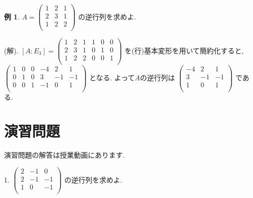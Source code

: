 \documentclass[dvipdfmx,a4paper,11pt]{article}
\theoremstyle{definition}
\newtheorem{exa}[thm]{例}
\begin{document}
 \begin{exa}
 $
  A=\begin{pmatrix}
 1& 2&1 \\
 2& 3 & 1 \\
 1& 2 &  2 \\
 \end{pmatrix} 
 $
 の逆行列を求めよ.
 
 (解).
 $[A:E_3] = 
 \begin{pmatrix}
 1& 2&1  &1& 0&0 \\
 2& 3 & 1 &0& 1&0 \\
 1& 2 &  2 &0& 0&1 \\
 \end{pmatrix} 
 $
 を(行)基本変形を用いて簡約化すると, \\
 $
 \begin{pmatrix}
 1& 0&0  &-4& 2&1 \\
 0& 1 & 0 &3& -1&-1 \\
 0& 0&  1 &-1& 0&1 \\
 \end{pmatrix} 
 $
 となる. よって$A$の逆行列は
 $
 \begin{pmatrix}
-4& 2&1 \\
3& -1&-1\\
1& 0&1 \\
 \end{pmatrix} 
 $
 である.
 \end{exa}

\section{演習問題}
演習問題の解答は授業動画にあります.

1.
$
\begin{pmatrix}
 2& -1& 0\\
 2& -1 & -1 \\
 1& 0 &  -1 \\
 \end{pmatrix} 
 $
 の逆行列を求めよ.

 
\end{document}
